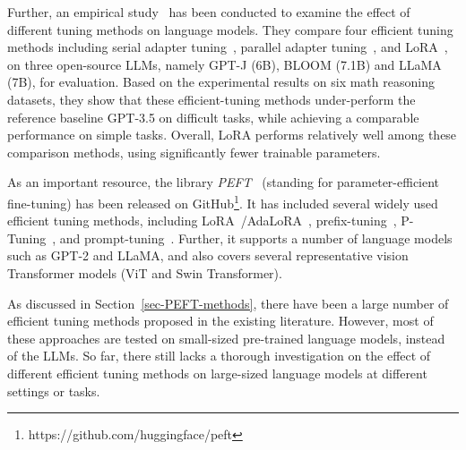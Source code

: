 Further, an empirical study~\cite{Hu-arXiv-2023} has been conducted to examine the effect of  different tuning methods on  language models.
They compare four efficient tuning methods including  serial adapter tuning~\cite{Houlsby-ICML-2019-Parameter},  parallel adapter tuning~\cite{He-ICLR-2022-towards,Pfeiffer-EMNLP-2022-MAD-X}, and LoRA~\cite{Hu-ICLR-2022-LoRA}, on three open-source LLMs,   namely GPT-J (6B), BLOOM (7.1B) and LLaMA (7B), for evaluation.  Based on the experimental results on six math reasoning datasets, they show that these efficient-tuning methods  under-perform the reference baseline GPT-3.5 on difficult tasks, while achieving a comparable performance on simple tasks. 
Overall, LoRA performs relatively  well among these  comparison methods, using significantly fewer trainable parameters.     

As an important resource, the library \emph{PEFT}~\cite{peft-github-2022} (standing for parameter-efficient fine-tuning) has been released on GitHub\footnote{https://github.com/huggingface/peft}. It has included several widely used efficient tuning methods, including LoRA~\cite{Hu-ICLR-2022-LoRA}/AdaLoRA~\cite{Zhang-arXiv-2023-Adaptive}, prefix-tuning~\cite{Li-ACL-2021-prefix,Liu-arXiv-2021-P-tuning}, P-Tuning~\cite{Liu-arXiv-2021-GPT}, and prompt-tuning~\cite{Lester-ACL-2021-The}. Further, it supports a number of language models such as GPT-2 and LLaMA, and also covers several representative vision Transformer models (\eg ViT and Swin Transformer).       


As  discussed in Section~\ref{sec-PEFT-methods}, there have been a large number of efficient tuning methods proposed in the existing literature. However,  most of these approaches are tested on  small-sized pre-trained  language models, instead of the LLMs. 
So far, there still lacks a thorough investigation on the effect of  different efficient tuning methods  on large-sized language models at different settings or tasks.  






